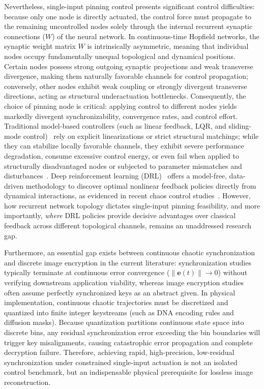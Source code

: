 \documentclass[a4paper,fleqn]{cas-sc}
\theoremstyle{plain}
\theoremstyle{definition}
\begin{document}
Nevertheless, single-input pinning control presents significant control difficulties: because only one node is directly actuated, the control force must propagate to the remaining uncontrolled nodes solely through the internal recurrent synaptic connections ($W$) of the neural network. In continuous-time Hopfield networks, the synaptic weight matrix $W$ is intrinsically asymmetric, meaning that individual nodes occupy fundamentally unequal topological and dynamical positions. Certain nodes possess strong outgoing synaptic projections and weak transverse divergence, making them naturally favorable channels for control propagation; conversely, other nodes exhibit weak coupling or strongly divergent transverse directions, acting as structural underactuation bottlenecks. Consequently, the choice of pinning node is critical: applying control to different nodes yields markedly divergent synchronizability, convergence rates, and control effort. Traditional model-based controllers (such as linear feedback, LQR, and sliding-mode control)~\cite{wang2003feedback,li2005impulsive,chen2014pinning,mobayen2018chaos} rely on explicit linearizations or strict structural matchings; while they can stabilize locally favorable channels, they exhibit severe performance degradation, consume excessive control energy, or even fail when applied to structurally disadvantaged nodes or subjected to parameter mismatches and disturbances~\cite{zhang2011weak,cao2024synchronisation}. Deep reinforcement learning (DRL)~\cite{sutton2018reinforcement,mnih2015human,carlucho2020adaptive} offers a model-free, data-driven methodology to discover optimal nonlinear feedback policies directly from dynamical interactions, as evidenced in recent chaos control studies~\cite{bucci2019control,vashishtha2020restoring,han2021control,cheng2023deep,cheng2025generalized,yau2024ppo,xu2025ppo,jin2025Deep,weissenbacher2025reinforcement}. However, how recurrent network topology dictates single-input pinning feasibility, and more importantly, \emph{where} DRL policies provide decisive advantages over classical feedback across different topological channels, remains an unaddressed research gap.

Furthermore, an essential gap exists between continuous chaotic synchronization and discrete image encryption in the current literature: synchronization studies typically terminate at continuous error convergence ($\|\mathbf{e}(t)\| \to 0$) without verifying downstream application viability, whereas image encryption studies often assume perfectly synchronized keys as an abstract given. In physical implementation, continuous chaotic trajectories must be discretized and quantized into finite integer keystreams (such as DNA encoding rules and diffusion masks). Because quantization partitions continuous state space into discrete bins, any residual synchronization error exceeding the bin boundaries will trigger key misalignments, causing catastrophic error propagation and complete decryption failure. Therefore, achieving rapid, high-precision, low-residual synchronization under constrained single-input actuation is not an isolated control benchmark, but an indispensable physical prerequisite for lossless image reconstruction.
\end{document}
